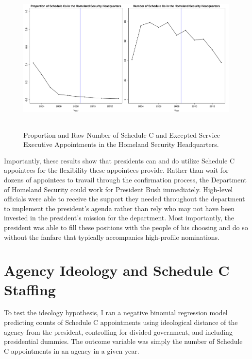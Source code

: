 \documentclass[12pt]{article}
\begin{document}
\begin{figure}[!h]
\begin{center}
\includegraphics[height=3in,width=6in]{DHSProportionRawNumber.pdf}
\caption{Proportion and Raw Number of Schedule C and Excepted Service Executive Appointments in the Homeland Security Headquarters.}
\end{center}
\end{figure}

Importantly, these results show that presidents can and do utilize Schedule C appointees for the flexibility these appointees provide. Rather than wait for dozens of appointees to travail through the confirmation process, the Department of Homeland Security could work for President Bush immediately. High-level officials  were able to receive the support they needed throughout the department to implement the president's agenda rather than rely who may not have been invested in the president's mission for the department. Most importantly, the president was able to fill these positions with the people of his choosing and do so without the fanfare that typically accompanies high-profile nominations. 


\section*{Agency Ideology and Schedule C Staffing}
To test the ideology hypothesis, I ran a negative binomial regression model predicting counts of Schedule C appointments using ideological distance of the agency from the president, controlling for divided government, and including presidential dummies. The outcome variable was simply the number of Schedule C appointments in an agency in a given year.
\end{document}
